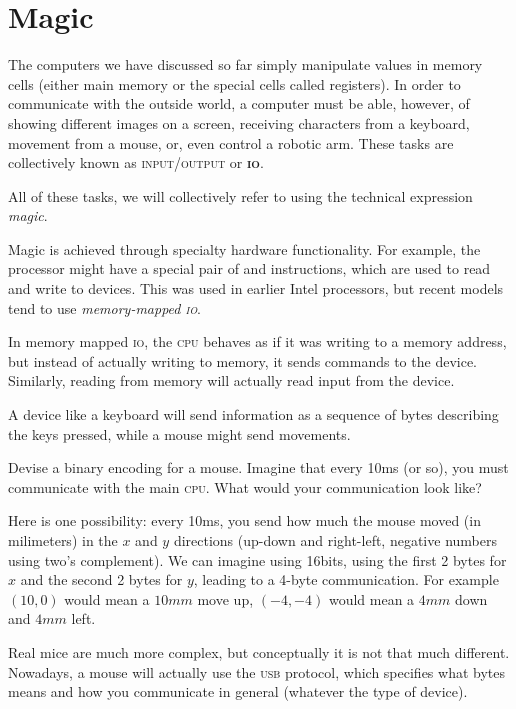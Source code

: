 \section{Magic}

The computers we have discussed so far simply manipulate values in memory cells
(either main memory or the special cells called registers). In order to
communicate with the outside world, a computer must be able, however, of
showing different images on a screen, receiving characters from a keyboard,
movement from a mouse, or, even control a robotic arm. These tasks are
collectively known as \textsc{input/output} or \textbf{\textsc{io}}.

All of these tasks, we will collectively refer to using the technical
expression \emph{magic}.

Magic is achieved through specialty hardware functionality. For example, the
processor might have a special pair of  and 
instructions, which are used to read and write to devices. This was used in
earlier Intel processors, but recent models tend to use \emph{memory-mapped
\textsc{io}}.

In memory mapped \textsc{io}, the \textsc{cpu} behaves as if it was writing to
a memory address, but instead of actually writing to memory, it sends commands
to the device. Similarly, reading from memory will actually read input from the
device.

A device like a keyboard will send information as a sequence of bytes
describing the keys pressed, while a mouse might send movements.

\begin{exercise}
Devise a binary encoding for a mouse. Imagine that every 10ms (or so), you must
communicate with the main \textsc{cpu}. What would your communication look like?
\begin{solution}
Here is one possibility: every 10ms, you send how much the mouse moved (in
milimeters) in the $x$ and $y$ directions (up-down and right-left, negative
numbers using two's complement). We can imagine using 16bits, using the first 2
bytes for $x$ and the second 2 bytes for $y$, leading to a 4-byte
communication. For example $(10,0)$ would mean a $10mm$ move up, $(-4,-4)$
would mean a $4mm$ down and $4mm$ left.

Real mice are much more complex, but conceptually it is not that much
different. Nowadays, a mouse will actually use the \textsc{usb} protocol, which
specifies what bytes means and how you communicate in general (whatever the
type of device).
\end{solution}
\end{exercise}

